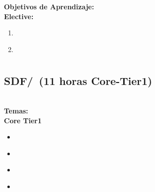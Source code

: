 \noindent \textbf{Objetivos de Aprendizaje:}\\
\noindent \textbf{Elective:}
\begin{enumerate}
	\setcounter{enumi}{0}
	\item \PLLogicProgrammingLOUseAToConventional\xspace[\PLLogicProgrammingLOUseAToConventionalLevel]\label{sec:BOK:PLLogicProgrammingLOUseAToConventional}
	\item \PLLogicProgrammingLOUseAToAlgorithm\xspace[\PLLogicProgrammingLOUseAToAlgorithmLevel]\label{sec:BOK:PLLogicProgrammingLOUseAToAlgorithm}
\end{enumerate}




\section{\SDF}\label{sec:BOK:SDF}
\SDFBOKDescription


\subsection{SDF/\SDFAlgorithmsandDesign~(11 horas Core-Tier1)}\label{sec:BOK:SDFAlgorithmsandDesign}
\SDFAlgorithmsandDesignDescription\\
\noindent \textbf{Temas:}\\
\noindent \textbf{Core Tier1}
\begin{itemize}
	\item \SDFAlgorithmsandDesignTopicThe\label{sec:BOK:SDFAlgorithmsandDesignTopicThe}
	\item \SDFAlgorithmsandDesignTopicTheRole\label{sec:BOK:SDFAlgorithmsandDesignTopicTheRole}
	\item \SDFAlgorithmsandDesignTopicProblem\label{sec:BOK:SDFAlgorithmsandDesignTopicProblem}
	\item \SDFAlgorithmsandDesignTopicFundamental\label{sec:BOK:SDFAlgorithmsandDesignTopicFundamental}
\end{itemize}


